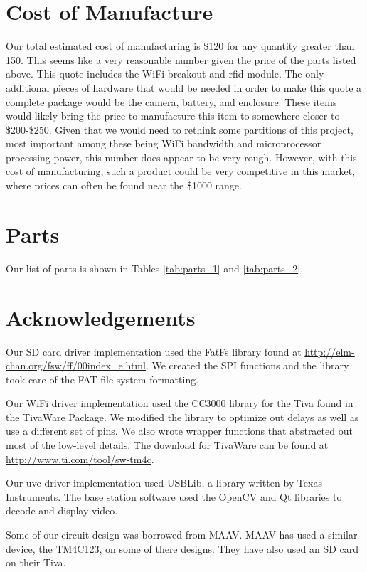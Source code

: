 \documentclass[12pt]{article}
\begin{document}
\section{Cost of Manufacture}
Our total estimated cost of manufacturing is \$120 for any quantity greater
than 150. This seems like a very reasonable number given the price of the parts
listed above. This quote includes the WiFi breakout and \gls{rfid} module. The
only additional pieces of hardware that would be needed in order to make this
quote a complete package would be the camera, battery, and enclosure. These
items would likely bring the price to manufacture this item to somewhere closer
to \$200-\$250. Given that we would need to rethink some partitions of this
project, most important among these being WiFi bandwidth and microprocessor
processing power, this number does appear to be very rough. However, with this
cost of manufacturing, such a product could be very competitive in this market,
where prices can often be found near the \$1000 range.

\section{Parts}
Our list of parts is shown in Tables \ref{tab:parts_1} and \ref{tab:parts_2}.



\section{Acknowledgements}

Our SD card driver implementation used the FatFs library found at
\url{http://elm-chan.org/fsw/ff/00index\_e.html}. We created the SPI functions
and the library took care of the FAT file system formatting.

Our WiFi driver implementation used the CC3000 library for the Tiva found in
the TivaWare Package. We modified the library to optimize out delays as well as
use a different set of pins. We also wrote wrapper functions that abstracted
out most of the low-level details. The download for TivaWare can be found at
\url{http://www.ti.com/tool/sw-tm4c}.

Our \gls{uvc} driver implementation used USBLib, a library written by Texas
Instruments. The base station software used the OpenCV and Qt libraries to
decode and display video.

Some of our circuit design was borrowed from MAAV. MAAV has used a similar
device, the TM4C123, on some of there designs. They have also used an SD card
on their Tiva.
\end{document}
